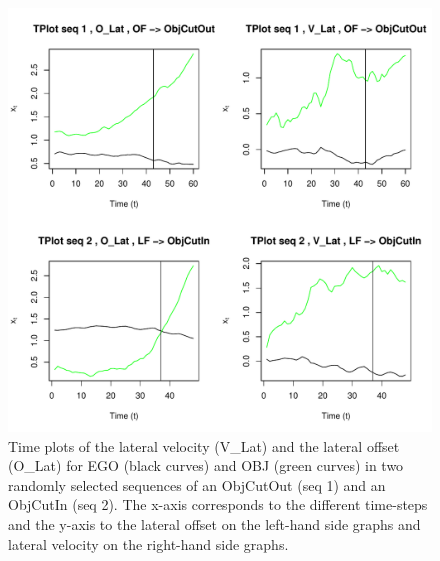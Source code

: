 \begin{figure}
\begin{center}
\includegraphics[scale=0.65]{./figures/DaimlerLE_EGO_L_LE_OBJ_R_OBJCut.pdf}
\caption{\label{Figure:daimlerTPlot}Time plots of the lateral velocity (V\_Lat) and the lateral offset (O\_Lat) for EGO (black curves) and OBJ (green curves) in two randomly selected sequences of an ObjCutOut (seq 1) and an ObjCutIn (seq 2). The x-axis corresponds to the different time-steps and the y-axis to the lateral offset on the left-hand side graphs and lateral velocity on the right-hand side graphs.}
\end{center}
\end{figure}

